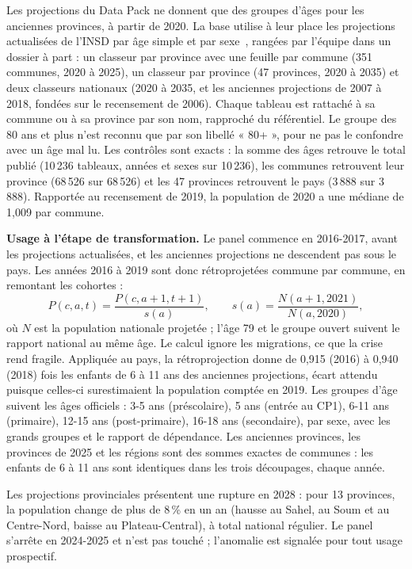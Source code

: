 \documentclass{article}
\begin{document}
Les projections du Data Pack ne donnent que des groupes d'âges pour les anciennes provinces, à partir de 2020. La base utilise à leur place les projections actualisées de l'INSD par âge simple et par sexe~\cite{insd_projections}, rangées par l'équipe dans un dossier à part : un classeur par province avec une feuille par commune (351 communes, 2020 à 2025), un classeur par province (47 provinces, 2020 à 2035) et deux classeurs nationaux (2020 à 2035, et les anciennes projections de 2007 à 2018, fondées sur le recensement de 2006). Chaque tableau est rattaché à sa commune ou à sa province par son nom, rapproché du référentiel. Le groupe des 80 ans et plus n'est reconnu que par son libellé « 80+ », pour ne pas le confondre avec un âge mal lu. Les contrôles sont exacts : la somme des âges retrouve le total publié (10\,236 tableaux, années et sexes sur 10\,236), les communes retrouvent leur province (68\,526 sur 68\,526) et les 47 provinces retrouvent le pays (3\,888 sur 3\,888). Rapportée au recensement de 2019, la population de 2020 a une médiane de 1,009 par commune.

\textbf{Usage à l'étape de transformation.} Le panel commence en 2016-2017, avant les projections actualisées, et les anciennes projections ne descendent pas sous le pays. Les années 2016 à 2019 sont donc rétroprojetées commune par commune, en remontant les cohortes :
\begin{equation}
P(c, a, t) = \frac{P(c, a+1, t+1)}{s(a)}, \qquad s(a) = \frac{N(a+1, 2021)}{N(a, 2020)},
\end{equation}
où $N$ est la population nationale projetée ; l'âge 79 et le groupe ouvert suivent le rapport national au même âge. Le calcul ignore les migrations, ce que la crise rend fragile. Appliquée au pays, la rétroprojection donne de 0,915 (2016) à 0,940 (2018) fois les enfants de 6 à 11 ans des anciennes projections, écart attendu puisque celles-ci surestimaient la population comptée en 2019. Les groupes d'âge suivent les âges officiels : 3-5 ans (préscolaire), 5 ans (entrée au CP1), 6-11 ans (primaire), 12-15 ans (post-primaire), 16-18 ans (secondaire), par sexe, avec les grands groupes et le rapport de dépendance. Les anciennes provinces, les provinces de 2025 et les régions sont des sommes exactes de communes : les enfants de 6 à 11 ans sont identiques dans les trois découpages, chaque année.

Les projections provinciales présentent une rupture en 2028 : pour 13 provinces, la population change de plus de 8\,\% en un an (hausse au Sahel, au Soum et au Centre-Nord, baisse au Plateau-Central), à total national régulier. Le panel s'arrête en 2024-2025 et n'est pas touché ; l'anomalie est signalée pour tout usage prospectif.
\end{document}
